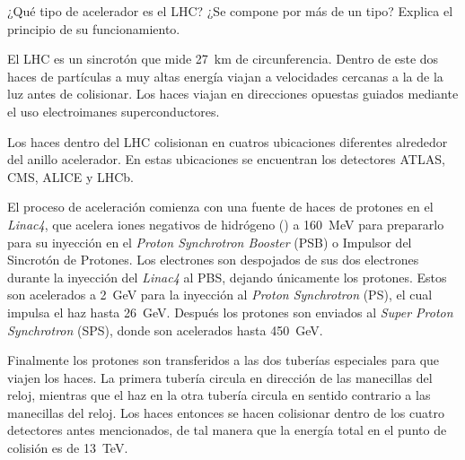 \documentclass[./../main.tex]{subfiles}
\begin{document}
    \begin{exercise}
        ¿Qué tipo de acelerador es el LHC? ¿Se compone por más de un tipo? Explica el principio de su funcionamiento.

        \begin{solution}
            El LHC es un sincrotón que mide \SI{27}{\km} de circunferencia. Dentro de este dos haces de partículas a muy altas energía viajan a velocidades cercanas a la de la luz antes de colisionar. Los haces viajan en direcciones opuestas guiados mediante el uso electroimanes superconductores. 

            Los haces dentro del LHC colisionan en cuatros ubicaciones diferentes alrededor del anillo acelerador. En estas ubicaciones se encuentran los detectores ATLAS, CMS, ALICE y LHCb.

            El proceso de aceleración comienza con una fuente de haces de protones en el \emph{Linac4}, que acelera iones negativos de hidrógeno () a \SI{160}{\MeV} para prepararlo para su inyección en el \emph{Proton Synchrotron Booster} (PSB) o Impulsor del Sincrotón de Protones. Los electrones son despojados de sus dos electrones durante la inyección del \emph{Linac4} al PBS, dejando únicamente los protones. Estos son acelerados a \SI{2}{\GeV} para la inyección al \emph{Proton Synchrotron} (PS), el cual impulsa el haz hasta \SI{26}{\GeV}. Después los protones son enviados al \emph{Super Proton Synchrotron} (SPS), donde son acelerados hasta \SI{450}{\GeV}.

            Finalmente los protones son transferidos a las dos tuberías especiales para que viajen los haces. La primera tubería circula en dirección de las manecillas del reloj, mientras que el haz en la otra tubería circula en sentido contrario a las manecillas del reloj. Los haces entonces se hacen colisionar dentro de los cuatro detectores antes mencionados, de tal manera que la energía total en el punto de colisión es de \SI{13}{\TeV}.


\end{solution}
\end{exercise}
\end{document}

